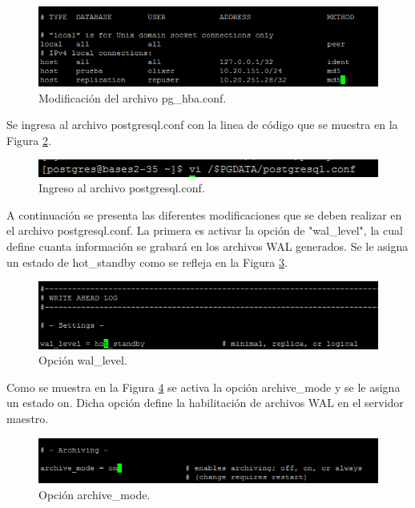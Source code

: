 \begin{figure}[H]
\centering
\includegraphics[width=\columnwidth]{eRelatedWorks/src/6}
\caption{Modificación del archivo pg\_hba.conf. }\label{fig:6}
\end{figure}

Se ingresa al archivo postgresql.conf con la linea de código que se muestra en la Figura \ref{fig:7}.


\begin{figure}[H]
\centering
\includegraphics[width=\columnwidth]{eRelatedWorks/src/7}
\caption{Ingreso al archivo postgresql.conf. }\label{fig:7}
\end{figure}

A continuación se presenta las diferentes modificaciones que se deben realizar en el archivo postgresql.conf. La primera es activar la opción de "wal\_level", la cual define cuanta información se grabará en los archivos WAL generados. Se le asigna un estado de hot\_standby como se refleja en la Figura \ref{fig:8}.
\begin{figure}[H]
\centering
\includegraphics[width=\columnwidth]{eRelatedWorks/src/8}
\caption{Opción wal\_level. }\label{fig:8}
\end{figure}

Como se muestra en la Figura \ref{fig:9} se activa la opción archive\_mode y se le asigna un estado on. Dicha opción define la habilitación de archivos WAL en el servidor maestro.

\begin{figure}[H]
\centering
\includegraphics[width=\columnwidth]{eRelatedWorks/src/9}
\caption{Opción archive\_mode.  }\label{fig:9}
\end{figure}


